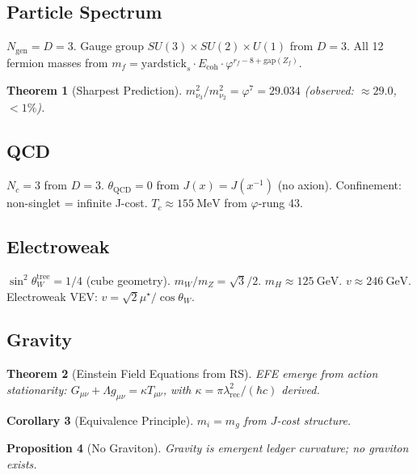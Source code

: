 \documentclass[12pt,a4paper]{article}
\newtheorem{theorem}{Theorem}[section]
\newtheorem{corollary}[theorem]{Corollary}
\newtheorem{proposition}[theorem]{Proposition}
\theoremstyle{definition}
\theoremstyle{remark}
\begin{document}
\subsection{Particle Spectrum}

$N_\mathrm{gen} = D = 3$. Gauge group $SU(3)\times SU(2)\times U(1)$ from $D=3$.
All 12 fermion masses from $m_f = \mathrm{yardstick}_s \cdot E_\mathrm{coh} \cdot \varphi^{r_f - 8 + \mathrm{gap}(Z_f)}$.

\begin{theorem}[Sharpest Prediction]
$m_{\nu_3}^2/m_{\nu_2}^2 = \varphi^7 = 29.034$ (observed: $\approx 29.0$, $< 1\%$).
\end{theorem}

\subsection{QCD}

$N_c = 3$ from $D = 3$. $\theta_\mathrm{QCD} = 0$ from $J(x) = J(x^{-1})$ (no axion).
Confinement: non-singlet = infinite J-cost. $T_c \approx 155~\mathrm{MeV}$ from $\varphi$-rung 43.

\subsection{Electroweak}

$\sin^2\theta_W^\mathrm{tree} = 1/4$ (cube geometry). 
$m_W/m_Z = \sqrt{3}/2$. $m_H \approx 125~\mathrm{GeV}$. $v \approx 246~\mathrm{GeV}$.
Electroweak VEV: $v = \sqrt{2}\mu^\star/\cos\theta_W$.

\subsection{Gravity}

\begin{theorem}[Einstein Field Equations from RS]
EFE emerge from action stationarity: $G_{\mu\nu} + \Lambda g_{\mu\nu} = \kappa T_{\mu\nu}$,
with $\kappa = \pi\lambda_\mathrm{rec}^2/(\hbar c)$ derived.
\end{theorem}

\begin{corollary}[Equivalence Principle]
$m_i = m_g$ from $J$-cost structure.
\end{corollary}

\begin{proposition}[No Graviton]
Gravity is emergent ledger curvature; no graviton exists.
\end{proposition}
\end{document}
